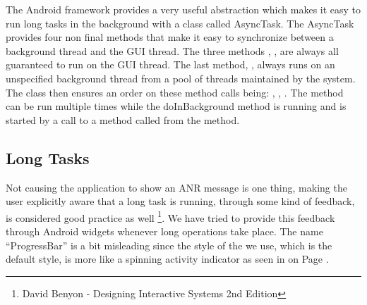 The Android framework provides a very useful abstraction which makes it easy to run long tasks in the background with a class called AsyncTask. The AsyncTask provides four non final methods that make it easy to synchronize between a background thread and the GUI thread. The three methods , ,  are always all guaranteed to run on the GUI thread. The last method, , always runs on an unspecified background thread from a pool of threads maintained by the system. The class then ensures an order on these method calls being: , , . The  method can be run multiple times while the doInBackground method is running and is started by a call to a method called  from the  method.  

\subsection{Long Tasks}

Not causing the application to show an ANR message is one thing, making the user explicitly aware that a long task is running, through some kind of feedback, is considered good practice as well \footnote{David Benyon - Designing Interactive Systems 2nd Edition}. We have tried to provide this feedback through Android  widgets whenever long operations take place. The name ``ProgressBar'' is a bit misleading since the style of the  we use, which is the default style, is more like a spinning activity indicator as seen in  on Page \pageref{fig:dialog_waiting}. 